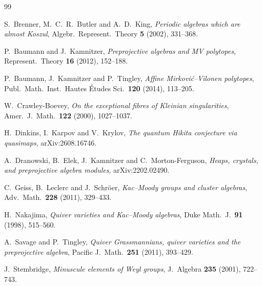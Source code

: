 \documentclass[reqno]{amsart}
\theoremstyle{plain}
\theoremstyle{definition}
\begin{document}
\begin{thebibliography}{99}

 S.~Brenner, M.~C.~R.~Butler and A.~D.~King, \emph{Periodic
algebras which are almost Koszul}, Algebr.\ Represent.\ Theory \textbf{5}
(2002), 331--368.

 P.~Baumann and J.~Kamnitzer, \emph{Preprojective algebras and MV
polytopes}, Represent.\ Theory \textbf{16} (2012), 152--188.

 P.~Baumann, J.~Kamnitzer and P.~Tingley, \emph{Affine
Mirkovi\'c--Vilonen polytopes}, Publ.\ Math.\ Inst.\ Hautes \'Etudes Sci.\
\textbf{120} (2014), 113--205.

 W.~Crawley-Boevey, \emph{On the exceptional fibres of Kleinian
singularities}, Amer.\ J.\ Math.\ \textbf{122} (2000), 1027--1037.

 H.~Dinkins, I.~Karpov and V.~Krylov, \emph{The quantum Hikita
conjecture via quasimaps}, arXiv:2608.16746.

 A.~Dranowski, B.~Elek, J.~Kamnitzer and C.~Morton-Ferguson,
\emph{Heaps, crystals, and preprojective algebra modules}, arXiv:2202.02490.

 C.~Geiss, B.~Leclerc and J.~Schr\"oer, \emph{Kac--Moody groups
and cluster algebras}, Adv.\ Math.\ \textbf{228} (2011), 329--433.

 H.~Nakajima, \emph{Quiver varieties and Kac--Moody algebras},
Duke Math.\ J.\ \textbf{91} (1998), 515--560.

 A.~Savage and P.~Tingley, \emph{Quiver Grassmannians, quiver
varieties and the preprojective algebra}, Pacific J.\ Math.\ \textbf{251}
(2011), 393--429.

 J.~Stembridge, \emph{Minuscule elements of Weyl groups}, J.\
Algebra \textbf{235} (2001), 722--743.

\end{thebibliography}
\end{document}
